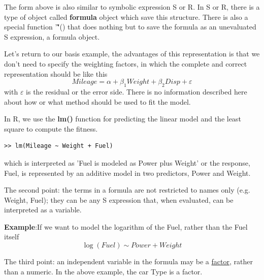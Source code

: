 The form above is also similar to symbolic expression S or R. In S or
R, there is a type of object called {\bf formula} object which save
this structure. There is also a special function '\~"() that does
nothing but to save the formula as an unevaluated S expression, a
formula object.

Let's return to our basis example, the advantages of this
representation is that we don't need to specify the weighting
factors, in which the complete and correct representation should be
like this
\begin{equation}
  \label{eq:12}
  Mileage = \alpha + \beta_1 Weight + \beta_2 Disp + \varepsilon
\end{equation}
with $\varepsilon$ is the residual or the error side. There is no
information described here about how or what method should be used to
fit the model.

In R, we use the {\bf lm()} function for predicting the linear model
and the least square to compute the fitness.

\begin{lstlisting}
>> lm(Mileage ~ Weight + Fuel)
\end{lstlisting}
which is interpreted as 'Fuel is modeled as Power plus Weight' or
the response, Fuel, is represented by an additive model in two
predictors, Power and Weight.

The second point: the terms in a formula are not restricted to names
only (e.g. Weight, Fuel); they can be any S expression that, when
evaluated, can be interpreted as a variable.


{\bf Example}:If we want to model the logarithm of the Fuel, rather
than the Fuel itself
\begin{equation}
  \label{eq:17}
  \log(Fuel) \sim Power + Weight
\end{equation}

The third point: an independent variable in the formula may be a
\hyperref[sec:factor]{factor}, rather than a numeric. In the above
example, the car Type is a factor.

